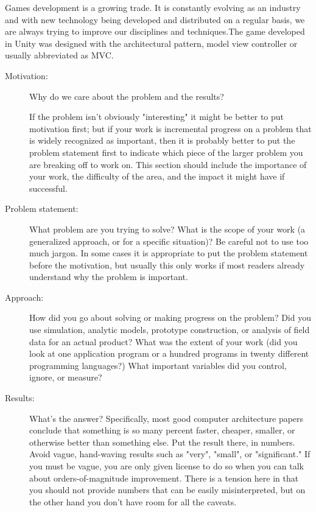 

Games development is a growing trade. It is constantly evolving as an industry and with new technology being developed and distributed on a regular basis, we are always trying to improve our disciplines and techniques.The game developed in Unity was designed with the architectural pattern, model view controller or usually abbreviated as MVC.

\begin{description}
  \item[Motivation:] Why do we care about the problem and the results?
  
   If the problem isn't obviously
"interesting" it might be better to put motivation first; but if your work is incremental progress
on a problem that is widely recognized as important, then it is probably better to put the problem
statement first to indicate which piece of the larger problem you are breaking off to work on. This
section should include the importance of your work, the difficulty of the area, and the impact it
might have if successful.

  \item[Problem statement:]  What problem are you trying to solve? What is the
scope of your work (a generalized approach, or for a specific situation)? Be careful not to use too
much jargon. In some cases it is appropriate to put the problem statement before the motivation,
but usually this only works if most readers already understand why the problem is important.

  \item[Approach:] How did you go about solving or making progress on the problem? Did you use simulation,
analytic models, prototype construction, or analysis of field data for an actual product? What was
the extent of your work (did you look at one application program or a hundred programs in twenty
different programming languages?) What important variables did you control, ignore, or measure?

  \item[Results:] What's the answer? Specifically, most good computer architecture papers conclude that
something is so many percent faster, cheaper, smaller, or otherwise better than something else. Put
the result there, in numbers. Avoid vague, hand-waving results such as "very", "small", or
"significant." If you must be vague, you are only given license to do so when you can talk about
orders-of-magnitude improvement. There is a tension here in that you should not provide numbers
that can be easily misinterpreted, but on the other hand you don't have room for all the caveats.


\end{description}

